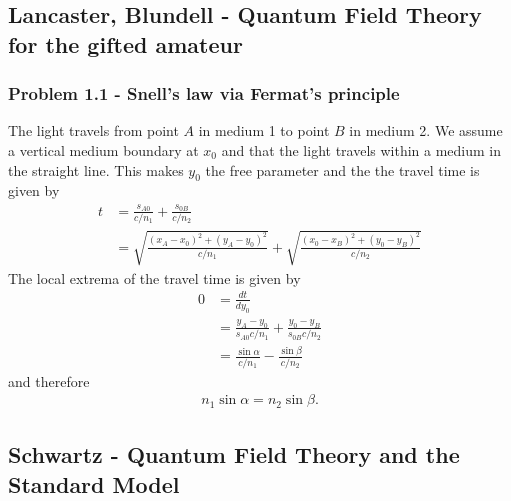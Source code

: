 \documentclass[10pt,a4paper]{article}
\theoremstyle{definition}
\begin{document}
\subsection{{\sc Lancaster, Blundell} - Quantum Field Theory for the gifted amateur}
\subsubsection{Problem 1.1 - Snell's law via Fermat's principle}
The light travels from point $A$ in medium 1 to point $B$ in medium 2. We assume a vertical medium boundary at $x_0$ and that the light travels within a medium in the straight line. This makes $y_0$ the free parameter and the the travel time is given by
\begin{align}
    t&=\frac{s_{A0}}{c/n_1}+\frac{s_{0B}}{c/n_2}\\
    &=\sqrt{\frac{(x_A-x_0)^2+(y_A-y_0)^2}{c/n_1}}+\sqrt{\frac{(x_0-x_B)^2+(y_0-y_B)^2}{c/n_2}}
\end{align}
The local extrema of the travel time is given by
\begin{align}
    0&=\frac{dt}{dy_0}\\
    &=\frac{y_A-y_0}{s_{A0}c/n_1}+\frac{y_0-y_B}{s_{0B}c/n_2}\\
    &=\frac{\sin\alpha}{c/n_1}-\frac{\sin\beta}{c/n_2}
\end{align}
and therefore
\begin{align}
n_1\sin\alpha=n_2\sin\beta.
\end{align}

\subsection{{\sc Schwartz} - Quantum Field Theory and the Standard Model}
\end{document}
